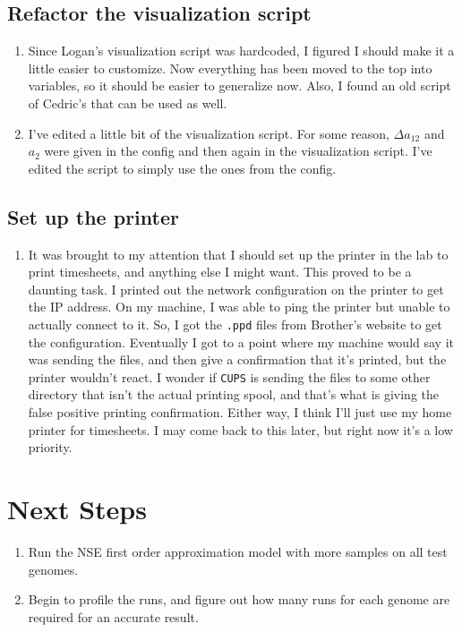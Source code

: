 \documentclass[12 pt]{article}
\begin{document}
 		\subsection{Refactor the visualization script}
 		\begin{enumerate}
 			\item Since Logan's visualization script was hardcoded, I figured I should make it a little easier to customize. Now everything has been moved to the top into variables, so it should be easier to generalize now. Also, I found an old script of Cedric's that can be used as well.
 			\item I've edited a little bit of the visualization script. For some reason, $ \Delta a_{12} $ and $ a_2 $ were given in the config and then again in the visualization script. I've edited the script to simply use the ones from the config.
 		\end{enumerate}
 			
 		\subsection{Set up the printer}
 		\begin{enumerate}
		 	\item It was brought to my attention that I should set up the printer in the lab to print timesheets, and anything else I might want. This proved to be a daunting task. I printed out the network configuration on the printer to get the IP address. On my machine, I was able to ping the printer but unable to actually connect to it. So, I got the \texttt{.ppd} files from Brother's website to get the configuration. Eventually I got to a point where my machine would say it was sending the files, and then give a confirmation that it's printed, but the printer wouldn't react. I wonder if \texttt{CUPS} is sending the files to some other directory that isn't the actual printing spool, and that's what is giving the false positive printing confirmation. Either way, I think I'll just use my home printer for timesheets. I may come back to this later, but right now it's a low priority.
 		\end{enumerate}
 		
 		\section{Next Steps}
	 		\begin{enumerate}
	 			\item Run the NSE first order approximation model with more samples on all test genomes.
	 			\item Begin to profile the runs, and figure out how many runs for each genome are required for an accurate result.
	 		\end{enumerate}
\end{document}
